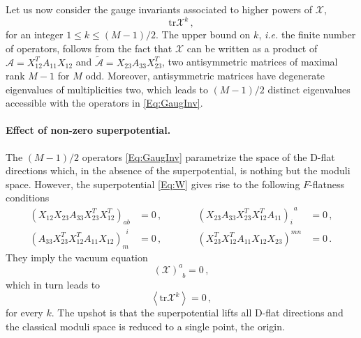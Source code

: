 \documentclass[a4paper,12pt]{article}
\begin{document}
Let us now consider the gauge invariants associated to higher powers of $\mathcal{X}$,
	\begin{equation}
		\mathrm{tr} \mathcal{X}^k \, , \label{Eq:GaugInv}
	\end{equation}
	for an integer $1\leqslant k\leqslant (M-1)/2$. The upper bound on $k$, {\it i.e.} the finite number of operators, follows from the fact that $\mathcal{X}$ can be written as a product of $\mathcal{A} = X_{12}^T A_{11} X_{12}$ and $\tilde{\mathcal{A}} = X_{23} A_{33} X_{23}^T$, two antisymmetric matrices of maximal rank $M-1$ for $M$ odd. Moreover, antisymmetric matrices have degenerate eigenvalues of multiplicities two, which leads to $(M-1)/2$ distinct eigenvalues accessible with the operators in \eqref{Eq:GaugInv}.

\paragraph{Effect of non-zero superpotential.}
The $(M-1)/2$ operators \eqref{Eq:GaugInv} parametrize the space of the D-flat directions which, in the absence of the superpotential, is nothing but the moduli space. However, the superpotential \eqref{Eq:W} gives rise to the following $F$-flatness conditions
	\begin{equation}
	\begin{array}{rlcrl}
	(X_{12}X_{23}A_{33}X_{23}^TX_{12}^T)_{ab} & = 0 \, , & \quad \quad & (X_{23}A_{33}X_{23}^TX_{12}^T A_{11})_{i}^{\, \, \, a} & = 0 \, , \\[.1cm]
	(A_{33}X_{23}^TX_{12}^T A_{11} X_{12})_{m}^{\,\,\, i} & = 0 \, , & \quad \quad &	 (X_{23}^TX_{12}^T A_{11}X_{12}X_{23})^{mn} & = 0 \, .
	\end{array}
	\end{equation}
They imply the vacuum equation
	\begin{equation}
		(\mathcal{X})^a_{\,\,\, b}  = 0 \, ,
	\end{equation}
which in turn leads to
	\begin{equation}
		\left< \mathrm{tr} \mathcal{X}^k \right> = 0  \, , 
	\end{equation}
	for every $k$. The upshot is that  the superpotential lifts all D-flat directions and the classical moduli space is reduced to a single point, the origin.
	
\end{document}
